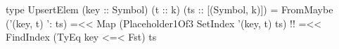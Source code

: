 \begin{code}
type UpsertElem (key :: Symbol)
                (t :: k)
                (ts :: [(Symbol, k)]) =
  FromMaybe ('(key, t) ': ts)
    =<< Map (Placeholder1Of3 SetIndex '(key, t) ts)  !!
    =<< FindIndex (TyEq key <=< Fst) ts
\end{code}
